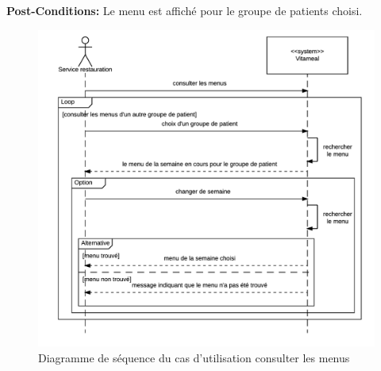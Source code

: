 \noindent \textbf{Post-Conditions:} Le menu est affiché pour le groupe de patients choisi.

\begin{figure}
\centering
\includegraphics[scale=0.75]{../../CasDUtilisations/ConsulterMenus/sequence_consulter_menus.png}
\caption{Diagramme de séquence du cas d'utilisation consulter les menus}
\label{ConsulterMenusSeq}
\end{figure}
